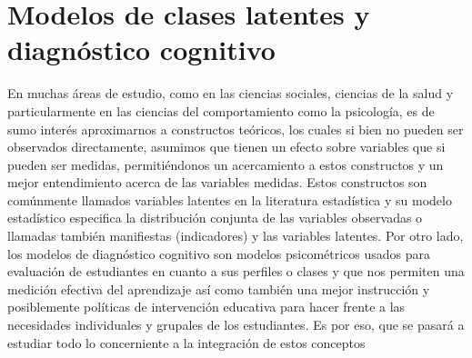 \chapter[Modelos de clases latentes y diagn\'{o}stico cognitivo]{Modelos de clases latentes y diagn\'{o}stico cognitivo} \label{cap:concepto}
	En muchas \'{a}reas de estudio, como en las ciencias sociales, ciencias de la salud y particularmente en las ciencias del comportamiento como la psicolog\'{i}a, es de sumo inter\'{e}s aproximarnos a constructos te\'{o}ricos, los cuales si bien no pueden ser observados directamente, asumimos que tienen un efecto sobre variables que si pueden ser medidas, permiti\'{e}ndonos un acercamiento a estos constructos y un mejor entendimiento acerca de las variables medidas.
	Estos constructos son com\'{u}nmente llamados variables latentes en la literatura estad\'{i}stica y su modelo estad\'{i}stico especifica la distribuci\'{o}n conjunta de las variables observadas o llamadas tambi\'{e}n manifiestas (indicadores) y las variables latentes.
	Por otro lado, los modelos de diagn\'{o}stico cognitivo son modelos psicom\'{e}tricos usados para evaluaci\'{o}n de estudiantes en cuanto a sus perfiles o clases y que nos permiten una medici\'{o}n efectiva del aprendizaje as\'{i} como tambi\'{e}n una mejor instrucci\'{o}n y posiblemente pol\'{i}ticas de intervenci\'{o}n educativa para hacer frente a las necesidades individuales y grupales de los estudiantes.
	Es por eso, que se pasar\'{a} a estudiar todo lo concerniente a la integraci\'{o}n de estos conceptos         
	
